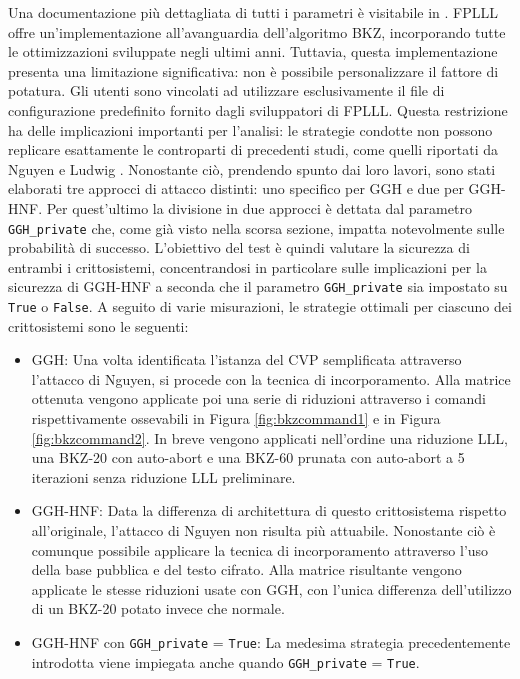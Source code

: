Una documentazione più dettagliata di tutti i parametri è visitabile in \cite{FPLLL}.
FPLLL offre un'implementazione all'avanguardia dell'algoritmo BKZ, incorporando tutte le 
ottimizzazioni sviluppate negli ultimi anni. Tuttavia, questa implementazione presenta 
una limitazione significativa: non è possibile personalizzare il fattore di potatura. 
Gli utenti sono vincolati ad utilizzare esclusivamente il file di configurazione 
predefinito fornito dagli sviluppatori di FPLLL. 
Questa restrizione ha delle implicazioni importanti per l'analisi: le strategie condotte
non possono replicare esattamente le controparti di 
precedenti studi, come quelli riportati da Nguyen \cite{Nguyen99} e Ludwig \cite{HNF04}.
Nonostante ciò, prendendo spunto dai loro lavori, sono stati elaborati tre approcci 
di attacco distinti: uno specifico per GGH e due per GGH-HNF. Per quest'ultimo la divisione 
in due approcci è dettata dal parametro \texttt{GGH\_private} che, come già visto nella 
scorsa sezione, impatta notevolmente sulle probabilità di successo. 
L'obiettivo del test è quindi valutare la sicurezza di entrambi i crittosistemi, 
concentrandosi in particolare sulle implicazioni per la sicurezza di GGH-HNF a 
seconda che il parametro \texttt{GGH\_private} sia impostato su \texttt{True} o 
\texttt{False}. A seguito di varie misurazioni, le strategie ottimali per ciascuno dei 
crittosistemi sono le seguenti:
\begin{itemize}
    \item GGH: Una volta identificata l'istanza del CVP semplificata attraverso l'attacco di Nguyen, 
    si procede con la tecnica di incorporamento. 
    Alla matrice ottenuta vengono applicate poi una serie di riduzioni attraverso i 
    comandi rispettivamente ossevabili in
    Figura \ref{fig:bkzcommand1} e in Figura \ref{fig:bkzcommand2}. In breve vengono 
    applicati nell'ordine una riduzione LLL, una BKZ-20 con auto-abort e una BKZ-60 prunata
    con auto-abort a 5 iterazioni senza riduzione LLL preliminare. 
    \item GGH-HNF: Data la differenza di 
    architettura di questo crittosistema rispetto all'originale, 
    l'attacco di Nguyen non risulta più attuabile. Nonostante ciò 
    è comunque possibile applicare la tecnica di incorporamento attraverso l'uso della 
    base pubblica e del testo cifrato. Alla matrice risultante vengono applicate le stesse
    riduzioni usate con GGH, con l'unica differenza dell'utilizzo di un BKZ-20 potato invece
    che normale. 
    \item GGH-HNF con \texttt{GGH\_private} = \texttt{True}: La medesima strategia 
    precedentemente introdotta viene impiegata anche quando \texttt{GGH\_private} = \texttt{True}. 
\end{itemize}

